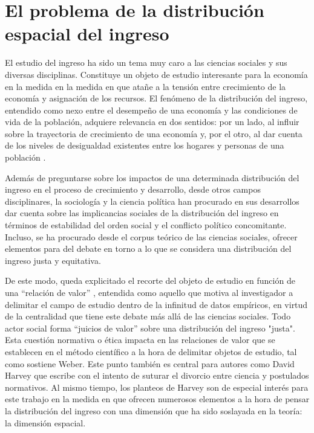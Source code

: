 
	\section{El problema de la distribución espacial del ingreso}
	
El estudio del ingreso ha sido un tema muy caro a las ciencias sociales y sus diversas disciplinas. Constituye un objeto de estudio interesante para la economía en la medida en la medida en que atañe a la tensión entre crecimiento de la economía y asignación de los recursos. El fenómeno de la distribución del ingreso, entendido como nexo entre el desempeño de una economía y las condiciones de vida de la población, adquiere relevancia en dos sentidos: por un lado, al influir sobre la trayectoria de crecimiento de una economía y, por el otro, al dar cuenta de los niveles de desigualdad existentes entre los hogares y personas de una población \cite{giayetto}. 

Además de preguntarse sobre los impactos de una determinada distribución del ingreso en el proceso de crecimiento y desarrollo, desde otros campos disciplinares, la sociología y la ciencia política han procurado en sus desarrollos dar cuenta sobre las implicancias sociales de la distribución del ingreso en términos de estabilidad del orden social y el conflicto político concomitante. Incluso, se ha procurado desde el corpus teórico de las ciencias sociales, ofrecer elementos para del debate en torno a lo que se considera una distribución del ingreso justa y equitativa.   

De este modo, queda explicitado el recorte del objeto de estudio en función de una “relación de valor” \cite{weber},  entendida como aquello que motiva al investigador a delimitar el campo de estudio dentro de la infinitud de datos empíricos, en virtud de la centralidad que tiene este debate más allá de las ciencias sociales. Todo actor social forma “juicios de valor” \cite{weber} sobre una distribución del ingreso "justa". Esta cuestión normativa o ética impacta en las relaciones de valor que se establecen en el método científico a la hora de delimitar objetos de estudio, tal como sostiene Weber. Este punto también es central para autores como David Harvey \citeyear{harvey} que escribe con el intento de suturar el divorcio entre ciencia y postulados normativos. Al mismo tiempo, los planteos de Harvey son de especial interés para este trabajo en la medida en que ofrecen numerosos elementos a la hora de pensar la distribución del ingreso con una dimensión que ha sido soslayada en la teoría: la dimensión espacial. 


